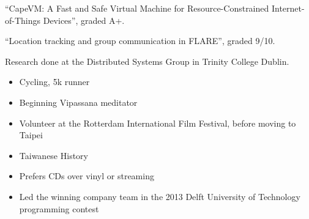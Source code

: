 “CapeVM: A Fast and Safe Virtual Machine for Resource-Constrained Internet-of-Things Devices”, graded A+.

\medskip


“Location tracking and group communication in FLARE”, graded 9/10.

\medskip

Research done at the Distributed Systems Group in Trinity College Dublin.







\begin{itemize}
\item\small{Cycling, 5k runner}
\item\small{Beginning Vipassana meditator}
\item\small{Volunteer at the Rotterdam International Film Festival, before moving to Taipei}
\item\small{Taiwanese History}
\item\small{Prefers CDs over vinyl or streaming}
\item\small{Led the winning company team in the 2013 Delft University of Technology programming contest}
\end{itemize}






